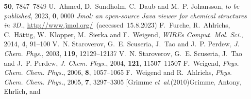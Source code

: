 \documentclass[twoside,twocolumn,9pt]{article}
\begin{document}
\begin{mcitethebibliography}{79}
  \textbf{50}, 7847--7849\relax
\mciteBstWouldAddEndPuncttrue
\mciteSetBstMidEndSepPunct{\mcitedefaultmidpunct}
{\mcitedefaultendpunct}{\mcitedefaultseppunct}\relax
\EndOfBibitem
{}
U.~Ahmed, D.~Sundholm, C.~Daub and M.~P. Johansson, \emph{to be published},
  2023, \textbf{0}, 0000\relax
\mciteBstWouldAddEndPuncttrue
\mciteSetBstMidEndSepPunct{\mcitedefaultmidpunct}
{\mcitedefaultendpunct}{\mcitedefaultseppunct}\relax
\EndOfBibitem
{}
\emph{{{\rm Jmol}: an open-source Java viewer for chemical structures in 3D.}},
  \url{http://www.jmol.org/}~(accessed~15.8.2023)\relax
\mciteBstWouldAddEndPuncttrue
\mciteSetBstMidEndSepPunct{\mcitedefaultmidpunct}
{\mcitedefaultendpunct}{\mcitedefaultseppunct}\relax
\EndOfBibitem
{}
F.~Furche, R.~Ahlrichs, C.~H\"{a}ttig, W.~Klopper, M.~Sierka and F.~Weigend,
  \emph{WIREs Comput. Mol. Sci.}, 2014, \textbf{4}, 91--100\relax
\mciteBstWouldAddEndPuncttrue
\mciteSetBstMidEndSepPunct{\mcitedefaultmidpunct}
{\mcitedefaultendpunct}{\mcitedefaultseppunct}\relax
\EndOfBibitem
{}
V.~N. Staroverov, G.~E. Scuseria, J.~Tao and J.~P. Perdew, \emph{J. Chem.
  Phys.}, 2003, \textbf{119}, 12129--12137\relax
\mciteBstWouldAddEndPuncttrue
\mciteSetBstMidEndSepPunct{\mcitedefaultmidpunct}
{\mcitedefaultendpunct}{\mcitedefaultseppunct}\relax
\EndOfBibitem
{}
V.~N. Staroverov, G.~E. Scuseria, J.~Tao and J.~P. Perdew, \emph{J. Chem.
  Phys.}, 2004, \textbf{121}, 11507--11507\relax
\mciteBstWouldAddEndPuncttrue
\mciteSetBstMidEndSepPunct{\mcitedefaultmidpunct}
{\mcitedefaultendpunct}{\mcitedefaultseppunct}\relax
\EndOfBibitem
{}
F.~Weigend, \emph{Phys. Chem. Chem. Phys.}, 2006, \textbf{8}, 1057--1065\relax
\mciteBstWouldAddEndPuncttrue
\mciteSetBstMidEndSepPunct{\mcitedefaultmidpunct}
{\mcitedefaultendpunct}{\mcitedefaultseppunct}\relax
\EndOfBibitem
{}
F.~Weigend and R.~Ahlrichs, \emph{Phys. Chem. Chem. Phys.}, 2005, \textbf{7},
  3297--3305\relax
\mciteBstWouldAddEndPuncttrue
\mciteSetBstMidEndSepPunct{\mcitedefaultmidpunct}
{\mcitedefaultendpunct}{\mcitedefaultseppunct}\relax
\EndOfBibitem
\bibitem[Grimme \emph{et~al.}(2010)Grimme, Antony, Ehrlich, and

\end{mcitethebibliography}
\end{document}
